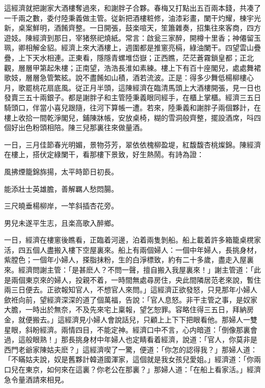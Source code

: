 這經濟就把謝家大酒樓奪過來，和謝胖子合夥。春梅又打點出五百兩本錢，共凑了一千兩之數，委付陸秉義做主管。従新把酒樓粧修，油漆彩畫，闌干灼耀，棟宇光新，桌案鮮明，酒餚齊整。一日開張，鼓楽喧天，笙簫雜奏，招集往來客商，四方遊妓。陳經濟到那日，宰猪祭祀燒紙。常言：啟瓮三家醉，開樽十里香；神僊留玉珮，卿相解金貂。經濟上來大酒樓上，週圍都是推窻亮槅，綠油闌干。四望雲山疊疊，上下天水相連。正東看，隱隱青螺堆岱嶽；正西瞧，茫茫蒼霧鎖皇都；正北觀，層層甲第起朱樓；正南望，浩浩長淮如素練。樓上下有百十座閣兒，處處舞裙歌妓，層層急管繁絃。說不盡餚如山積，酒若流波。正是：得多少舞低楊柳樓心月，歌罷桃花扇底風。従正月半頭，這陳經濟在臨清馬頭上大酒樓開張，見一日也發賣三五十兩銀子。都是謝胖子和主管陸秉義眼同經手，在櫃上掌櫃。經濟三五日騎頭口，伴當小喜兒跟隨，往河下算帳一遭。若來，陸秉義和謝胖子兩個夥計，在樓上收拾一間乾淨閣兒，鋪陳牀帳，安放桌椅，糊的雪洞般齊整，擺設酒席，呌四個好出色粉頭相陪。陳三兒那裏往來做量酒。

一日，三月佳節春光明媚，景物芬芳，翠依依槐柳盈堤，紅馥馥杏桃燦錦。陳經濟在樓上，搭伏定綠闌干，看那樓下景致，好生熱鬧。有詩為證：

\begin{myquote}
風拂煙籠錦旆揚，太平時節日初長。

能添壯士英雄膽，善解羈人愁悶腸。

三尺曉垂楊柳岸，一竿斜插杏花旁。

男兒未遂平生志，且楽高歌入醉鄉。
\end{myquote}

一日，經濟在樓窻後瞧看，正臨着河邊，泊着兩隻剝船。船上載着許多箱籠桌櫈家活，四五個人盡搬入樓下空屋裏來。船上有兩個婦人：一個中年婦人，長挑身材，紫膛色；一個年小婦人，搽脂抹粉，生的白淨標致，約有二十多歲，盡走入屋裏來。經濟問謝主管：「是甚麽人？不問一聲，擅自搬入我屋裏來！」謝主管道：「此是兩個東京來的婦人，投親不着，一時間無處尋房住，央此間隣居范老來說，暫住兩三日便去。正欲報知官人，不想官人來問。」這經濟正欲發怒，只見那年小婦人歛袵向前，望經濟深深的道了個萬福，告說：「官人息怒。非干主管之事，是奴家大膽，一時出於無奈，不及先來宅上稟報，望乞恕罪。容略住得三五日，拜納房金，就便搬去。」這經濟見小婦人會說話兒，只顧上上下下把眼看他。那婦人一雙星眼，斜盼經濟。兩情四目，不能定神。經濟口中不言，心内暗道：「倒像那裏會過，這般眼熟！」那長挑身材中年婦人也定睛看着經濟，說道：「官人，你莫非是西門老爺家陳姑夫麽？」這經濟喫了一驚，便道：「你怎的認得我？」那婦人道：「不瞞姑夫說，奴是舊夥計韓道國渾家，這個就是我女孩兒愛姐。」經濟道：「你兩口兒在東京，如何來在這裏？你老公在那裏？」那婦人道：「在船上看家活。」經濟急令量酒請來相見。

